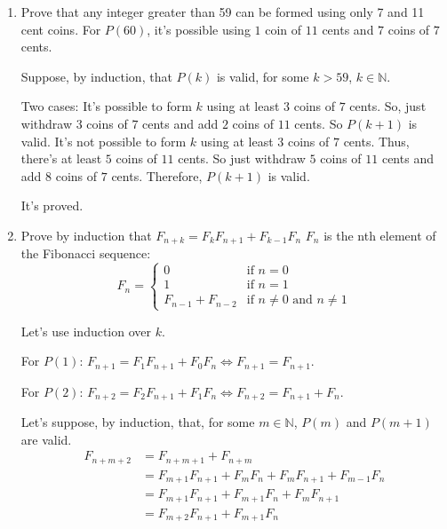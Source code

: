 \documentclass{article}
\begin{document}
\begin{enumerate}
  \item Prove that any integer greater than 59 can be formed using only 7 and 11 cent coins.
  \bigbreak
  For $P(60)$, it's possible using $1$ coin of $11$ cents and $7$ coins of $7$ cents.
  
  Suppose, by induction, that $P(k)$ is valid, for some $k>59$, $k \in \mathbb{N}$.
  
  Two cases:
  \subitem It's possible to form $k$ using at least $3$ coins of $7$ cents. So, just withdraw $3$ coins of $7$ cents and add $2$ coins of $11$ cents. So $P(k + 1)$ is valid.
  \subitem It's not possible to form $k$ using at least $3$ coins of $7$ cents. Thus, there's at least $5$ coins of $11$ cents. So just withdraw $5$ coins of $11$ cents and add $8$ coins of $7$ cents. Therefore, $P(k + 1)$ is valid.
  
  It's proved.
  \bigbreak
  \item Prove by induction that $F_{n+k}=F_{k}F_{n+1}+F_{k-1}F_{n}$
  \bigbreak
  $F_n$ is the nth element of the Fibonacci sequence:
  \begin{equation*}
      F_n =
      \left\{
      \begin{array}{cc}
         0  & \textrm{if $n = 0$} \\
         1  & \textrm{if $n = 1$} \\
         F_{n-1} + F_{n-2}  & \textrm{if $n \ne 0$ and $n \ne 1$}
      \end{array}
      \right.
  \end{equation*}
  
  Let's use induction over $k$.
  
  For $P(1)$: $F_{n+1}=F_{1}F_{n+1}+F_{0}F_{n} \iff F_{n+1}=F_{n+1}$.
  
  For $P(2)$: $F_{n+2}=F_{2}F_{n+1}+F_{1}F_{n} \iff F_{n+2}=F_{n+1}+F_{n}$.
  
  Let's suppose, by induction, that, for some $m \in \mathbb{N}$, $P(m)$ and $P(m + 1)$ are valid.
  \begin{equation*}
      \begin{aligned}
        F_{n+m+2} &= F_{n + m + 1} + F_{n + m}\\
        &= F_{m + 1}F_{n + 1} + F_m F_n + F_m F_{n + 1} + F_{m - 1} F_n\\
        &= F_{m + 1}F_{n + 1} + F_{m + 1} F_n + F_m F_{n + 1}\\
        &= F_{m + 2}F_{n + 1} + F_{m + 1} F_n
      \end{aligned}
  \end{equation*}
  

\end{enumerate}
\end{document}
